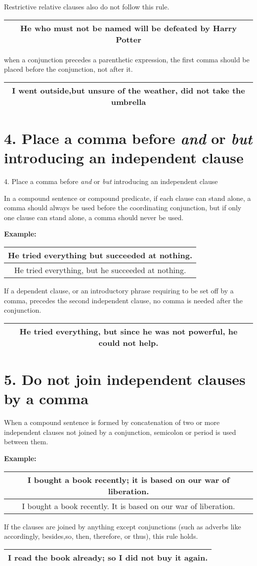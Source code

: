 \documentclass{report}
\newcommand{\SingleRowSingleCol}[1]{
    \begin{center}
    \begin{tabular}{|c|}
     \hline
     #1\\\hline
    \end{tabular}
    \end{center}
}
\newcommand{\DoubleRowSingleCol}[2]{
    \begin{center}
    \begin{tabular}{|c|}
     \hline
     #1\\\hline
     #2\\\hline
    \end{tabular}
    \end{center}
}
\begin{document}
\newpage

Restrictive relative clauses also do not follow this rule.
\SingleRowSingleCol{He who must not be named will be defeated by Harry Potter}

when a conjunction precedes a parenthetic expression, the first comma should be placed before the conjunction, not after it.
\SingleRowSingleCol{I went outside,but unsure of the weather, did not take the umbrella}
\endgraf\bigskip

\section*{4. Place a comma before \textit{and} or \textit{but} introducing an independent clause}

{4. Place a comma before \textit{and} or \textit{but} introducing an independent clause}

In a compound sentence or compound predicate, if each clause can stand alone, a comma should always be used before the coordinating conjunction, but if only one clause can stand alone, a comma should never be used.

\textbf{Example:}
\DoubleRowSingleCol
{He tried everything but succeeded at nothing.}
{He tried everything, but he succeeded at nothing.}

If a dependent clause, or an introductory phrase requiring to be set off by a comma,
precedes the second independent clause, no comma is needed after the conjunction.
\endgraf\bigskip

\SingleRowSingleCol
{He tried everything, but since he was not powerful, he could not help.}
\endgraf\bigskip

\section*{5. Do not join independent clauses by a comma}
When a compound sentence is formed by concatenation of two or more independent clauses not joined by a conjunction, semicolon or period is used between them.

\textbf{Example:}
\DoubleRowSingleCol
{I bought a book recently; it is based on our war of liberation.}
{I bought a book recently. It is based on our war of liberation.}

If the clauses are joined by anything except conjunctions (such as adverbs like accordingly, besides,so, then, therefore, or thus), this rule holds.
\SingleRowSingleCol{I read the book already; so I did not buy it again.}
\end{document}
